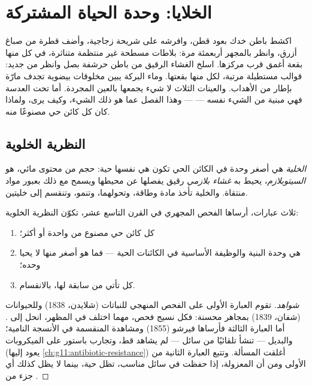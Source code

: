 \chapter{الخلايا: وحدة الحياة المشتركة}\label{ch:g10:cells-common-unit}

اكشط باطن خدك بعود قطن، وافرشه على شريحة زجاجية، وأضف قطرة من صباغ
أزرق، وانظر بالمجهر  أربعمئة مرة: بلاطات مسطحة غير منتظمة
متناثرة، في كل منها بقعة أغمق قرب مركزها. اسلخ الغشاء الرقيق من باطن
حرشفة بصل وانظر من جديد: قوالب مستطيلة مرتبة، لكل منها بقعتها. وماء
البركة يبين مخلوقات بيضوية تجدف مارّة بإطار من الأهداب. والعينات
الثلاث لا شيء يجمعها بالعين المجردة. أما تحت العدسة فهي مبنية من
الشيء نفسه ---  --- وهذا الفصل عما هو ذلك الشيء، وكيف يرى،
ولماذا كان كل كائن حي مصنوعًا منه.

\section{النظرية الخلوية}

\begin{definition}[الخلية]\label{def:g10:cells-common-unit:cell}
\emph{الخلية} هي أصغر وحدة في الكائن الحي تكون هي نفسها
حية: حجم من محتوى مائي، هو \emph{السيتوبلازم}، يحيط
به \emph{غشاء بلازمي} رقيق يفصلها عن محيطها ويسمح
مع ذلك بعبور مواد منتقاة. والخلية تأخذ مادة وطاقة، وتحولهما، وتنمو،
وتنقسم إلى خليتين.
\end{definition}

\begin{proposition}\label{prop:g10:cells-common-unit:theory}
ثلاث عبارات، أرساها الفحص المجهري في القرن التاسع عشر، تكوّن النظرية
الخلوية:
\begin{enumerate}
  \item كل كائن حي مصنوع من  واحدة أو أكثر؛
  \item {} هي وحدة البنية والوظيفة الأساسية في الكائنات الحية ---
        فما هو أصغر منها لا يحيا وحده؛
  \item كل  تأتي من  سابقة لها، بالانقسام.
\end{enumerate}
\end{proposition}
\begin{proof}[شواهد]
تقوم العبارة الأولى على الفحص المنهجي للنباتات (شلايدن، 1838)
وللحيوانات (شفان، 1839) بمجاهر محسنة: فكل نسيج فحص، مهما اختلف في
المظهر، انحل إلى . أما العبارة الثالثة فأرساها فيرشو (1855)
ومشاهدة  المنقسمة في الأنسجة النامية؛ والبديل ---  تنشأ
تلقائيًا من سائل --- لم يشاهد قط، وتجارب باستور على الميكروبات (يعود
إليها \cref{ch:g11:antibiotic-resistance}) أغلقت المسألة. وتتبع
العبارة الثانية من الأولى ومن أن  المعزولة، إذا حفظت في سائل
مناسب، تظل حية، بينما لا يظل كذلك أي جزء من .
\end{proof}

